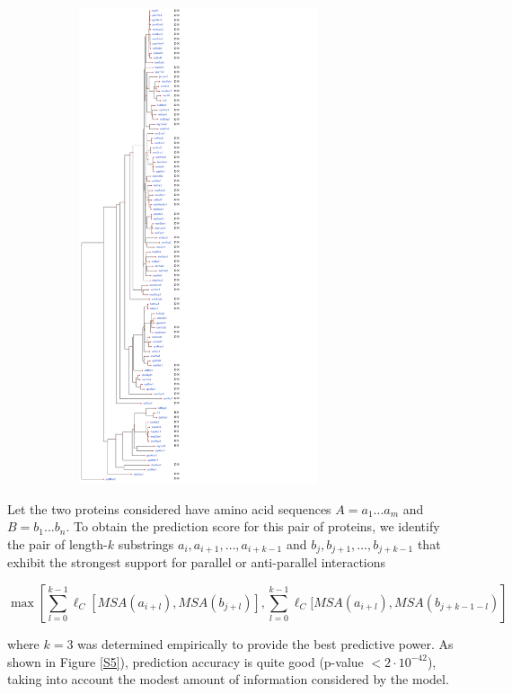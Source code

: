 \begin{figure}
\begin{subfigure}{.1\textwidth}
  \includegraphics[width=7cm]{figs/gwas_figure_4_tree_coevolution.png}
  \label{fig:sub2}
\end{subfigure}
\label{fig:gwas_jmol}
\end{figure}

Let the two proteins considered have amino acid sequences $A = a_1...a_m$ and $B = b_1...b_n$. To obtain the prediction score for this pair of proteins, we identify the pair of length-$k$ substrings $a_i, a_{i+1}, …, a_{i+k-1}$ and $b_j, b_{j+1}, …, b_{j+k-1}$ that exhibit the strongest support for parallel or anti-parallel interactions

\[
\max\left[ \sum_{l=0}^{k-1}{ \ell_C[ MSA(a_{i+l}) , MSA(b_{j+l}) ]},  \sum_{l=0}^{k-1}{\ell_C[ MSA(a_{i+l}) , MSA(b_{j+k-1-l})} \right]
\]

\noindent where $k=3$ was determined empirically to provide the best predictive power. 
As shown in Figure \ref{S5}), prediction accuracy is quite good (p-value $< 2 \cdot 10^{-42}$), taking into account the modest amount of information considered by the model.

